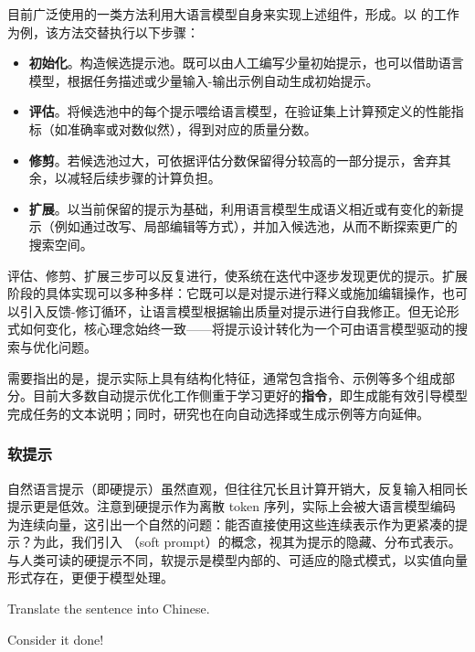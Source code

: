 目前广泛使用的一类方法利用大语言模型自身来实现上述组件，形成。以 \citet{zhou-etal:2023large} 的工作为例，该方法交替执行以下步骤：

\begin{itemize}
\item \textbf{初始化}。构造候选提示池。既可以由人工编写少量初始提示，也可以借助语言模型，根据任务描述或少量输入-输出示例自动生成初始提示。
\item \textbf{评估}。将候选池中的每个提示喂给语言模型，在验证集上计算预定义的性能指标（如准确率或对数似然），得到对应的质量分数。
\item \textbf{修剪}。若候选池过大，可依据评估分数保留得分较高的一部分提示，舍弃其余，以减轻后续步骤的计算负担。
\item \textbf{扩展}。以当前保留的提示为基础，利用语言模型生成语义相近或有变化的新提示（例如通过改写、局部编辑等方式），并加入候选池，从而不断探索更广的搜索空间。
\end{itemize}

评估、修剪、扩展三步可以反复进行，使系统在迭代中逐步发现更优的提示。扩展阶段的具体实现可以多种多样：它既可以是对提示进行释义或施加编辑操作，也可以引入反馈-修订循环，让语言模型根据输出质量对提示进行自我修正。但无论形式如何变化，核心理念始终一致——将提示设计转化为一个可由语言模型驱动的搜索与优化问题。

需要指出的是，提示实际上具有结构化特征，通常包含指令、示例等多个组成部分。目前大多数自动提示优化工作侧重于学习更好的\textbf{指令}，即生成能有效引导模型完成任务的文本说明；同时，研究也在向自动选择或生成示例等方向延伸。

\subsubsection{软提示}
\label{sec:soft-prompts}

\noindent 自然语言提示（即硬提示）虽然直观，但往往冗长且计算开销大，反复输入相同长提示更是低效。注意到硬提示作为离散 token 序列，实际上会被大语言模型编码为连续向量，这引出一个自然的问题：能否直接使用这些连续表示作为更紧凑的提示？为此，我们引入 （soft prompt）的概念，视其为提示的隐藏、分布式表示。与人类可读的硬提示不同，软提示是模型内部的、可适应的隐式模式，以实值向量形式存在，更便于模型处理。

\vspace{0.5em}
\begin{tcolorbox}[frame style={draw=none}]
\begingroup
\setlength{\leftskip}{2em}
\setlength{\rightskip}{2em}

Translate the sentence into Chinese.

\vspace{0.5em}

Consider it done!

\vspace{0.5em}

\underline{\hspace{2em}}

\endgroup
\end{tcolorbox}
\vspace{0.5em}

